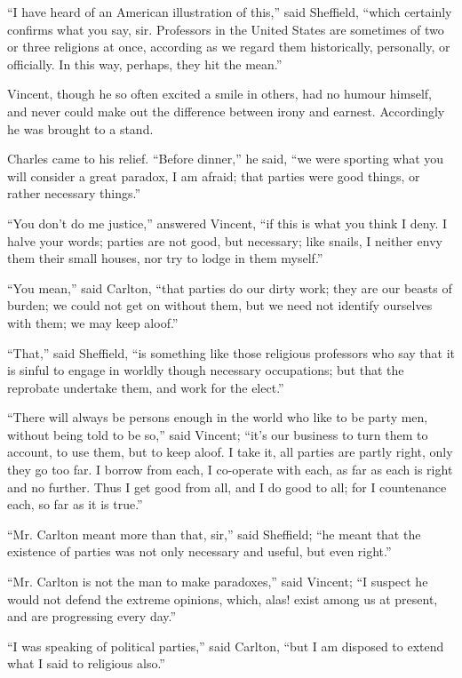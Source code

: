 ``I have heard of an American illustration of this,'' said
Sheffield, ``which certainly confirms what you say, sir.
Professors in the United States are sometimes of two or three
religions at once, according as we regard them historically,
personally, or officially. In this way, perhaps, they hit the
mean.''

Vincent, though he so often excited a smile in others, had no
humour himself, and never could make out the difference between irony
and earnest. Accordingly he was brought to a stand.

Charles came to his relief. ``Before dinner,'' he said,
``we were sporting what you will consider a great paradox, I am
afraid; that parties were good things, or rather necessary
things.''

``You don't do me justice,'' answered Vincent, ``if
this is what you think I deny. I halve your words; parties are
not good, but necessary; like snails, I neither envy them their small
houses, nor try to lodge in them myself.''

``You mean,'' said Carlton, ``that parties do our dirty
work; they are our beasts of burden; we could not get on without them,
but we need not identify ourselves with them; we may keep aloof.''

``That,'' said Sheffield, ``is something like those
religious professors who say that it is sinful to engage in worldly
though necessary occupations; but that the reprobate undertake them,
and work for the elect.''

``There will always be persons enough in the world who like to
be party men, without being told to be so,'' said Vincent;
``it's our business to turn them to account, to use them, but to
keep aloof. I take it, all parties are partly right, only they go too
far. I borrow from each, I co-operate with each, as far as each is
right and no further. Thus I get good from all, and I do good to all;
for I countenance each, so far as it is true.''

``Mr. Carlton meant more than that, sir,'' said Sheffield;
``he meant that the existence of parties was not only necessary
and useful, but even right.''

``Mr. Carlton is not the man to make paradoxes,'' said
Vincent; ``I suspect he would not defend the extreme opinions,
which, alas! exist among us at present, and are progressing every
day.''

``I was speaking of political parties,'' said Carlton,
``but I am disposed to extend what I said to religious also.''

